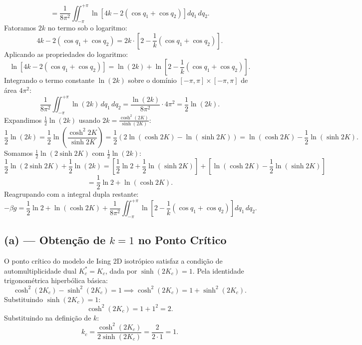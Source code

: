 \documentclass[11pt,a4paper]{article}
\begin{document}
%
\begin{equation}
    = \frac{1}{8\pi^2} \iint_{-\pi}^{+\pi} \ln\left[4k - 2(\cos q_1 + \cos q_2)\right] dq_1 \, dq_2.
\end{equation}
%
Fatoramos $2k$ no termo sob o logaritmo:
%
\begin{equation}
    4k - 2(\cos q_1 + \cos q_2) = 2k \cdot \left[ 2 - \frac{1}{k}(\cos q_1 + \cos q_2) \right].
\end{equation}
%
Aplicando as propriedades do logaritmo:
%
\begin{equation}
    \ln\left[4k - 2(\cos q_1 + \cos q_2)\right] = \ln(2k) + \ln\left[ 2 - \frac{1}{k}(\cos q_1 + \cos q_2) \right].
\end{equation}
%
Integrando o termo constante $\ln(2k)$ sobre o domínio $[-\pi,\pi] \times [-\pi,\pi]$ de área $4\pi^2$:
%
\begin{equation}
    \frac{1}{8\pi^2} \iint_{-\pi}^{+\pi} \ln(2k) \, dq_1 \, dq_2 = \frac{\ln(2k)}{8\pi^2} \cdot 4\pi^2 = \frac{1}{2} \ln(2k).
\end{equation}
%
Expandimos $\frac{1}{2}\ln(2k)$ usando $2k = \frac{\cosh^2(2K)}{\sinh(2K)}$:
%
\begin{equation}
    \frac{1}{2}\ln(2k) = \frac{1}{2}\ln\left(\frac{\cosh^2 2K}{\sinh 2K}\right) 
    = \frac{1}{2}\left( 2\ln(\cosh 2K) - \ln(\sinh 2K) \right) 
    = \ln(\cosh 2K) - \frac{1}{2}\ln(\sinh 2K).
\end{equation}
%
Somamos $\frac{1}{2}\ln(2\sinh 2K)$ com $\frac{1}{2}\ln(2k)$:
%
\begin{equation}
    \frac{1}{2}\ln(2\sinh 2K) + \frac{1}{2}\ln(2k) 
    = \left[ \frac{1}{2}\ln 2 + \frac{1}{2}\ln(\sinh 2K) \right] + \left[ \ln(\cosh 2K) - \frac{1}{2}\ln(\sinh 2K) \right]
\end{equation}
%
\begin{equation}
    = \frac{1}{2}\ln 2 + \ln(\cosh 2K).
\end{equation}
%
Reagrupando com a integral dupla restante:
%
\begin{equation}
    \boxed{-\beta g = \frac{1}{2}\ln 2 + \ln(\cosh 2K) + \frac{1}{8\pi^2} \iint_{-\pi}^{+\pi} \ln\left[ 2 - \frac{1}{k}(\cos q_1 + \cos q_2) \right] dq_1 \, dq_2.}
\end{equation}
%
\subsection*{(a) --- Obtenção de $k=1$ no Ponto Crítico}

O ponto crítico do modelo de Ising 2D isotrópico satisfaz a condição de automultiplicidade dual $K_c^* = K_c$, dada por $\sinh(2K_c) = 1$.
%
Pela identidade trigonométrica hiperbólica básica:
%
\begin{equation}
    \cosh^2(2K_c) - \sinh^2(2K_c) = 1 \implies \cosh^2(2K_c) = 1 + \sinh^2(2K_c).
\end{equation}
%
Substituindo $\sinh(2K_c) = 1$:
%
\begin{equation}
    \cosh^2(2K_c) = 1 + 1^2 = 2.
\end{equation}
%
Substituindo na definição de $k$:
%
\begin{equation}
    \boxed{k_c = \frac{\cosh^2(2K_c)}{2\sinh(2K_c)} = \frac{2}{2 \cdot 1} = 1.}
\end{equation}
%
\end{document}
